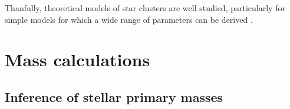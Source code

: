 Thanfully, theoretical models of star clusters are well studied, particularly for simple \citep{plummer_problem_1911} models for which a wide range of parameters can be derived \citep{portegies_zwart_young_2010}.






\section{Mass calculations}
\label{sec:dynamics:masses}



\subsection{Inference of stellar primary masses}
\label{sec:dynamics:masses:isochrones}

